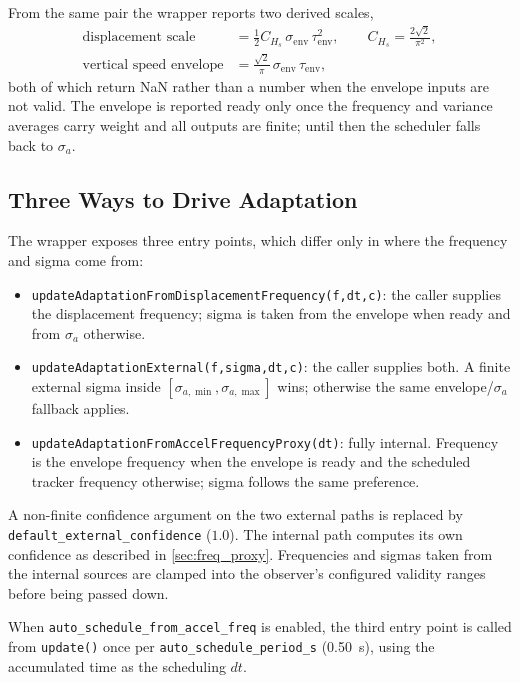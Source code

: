 \documentclass[conference]{IEEEtran}
\begin{document}
    From the same pair the wrapper reports two derived scales,
    \begin{align}
        \text{displacement scale} &= \tfrac12 C_{H_s}\,
        \sigma_{\mathrm{env}}\,\tau_{\mathrm{env}}^2,
        \qquad C_{H_s} = \frac{2\sqrt{2}}{\pi^2},\\
        \text{vertical speed envelope} &= \frac{\sqrt{2}}{\pi}\,
        \sigma_{\mathrm{env}}\,\tau_{\mathrm{env}},
    \end{align}
    both of which return NaN rather than a number when the envelope inputs are
    not valid. The envelope is reported ready only once the frequency and
    variance averages carry weight and all outputs are finite; until then the
    scheduler falls back to \(\sigma_a\).

    \subsection{Three Ways to Drive Adaptation}

    The wrapper exposes three entry points, which differ only in where the
    frequency and sigma come from:
    \begin{itemize}[leftmargin=1.4em]
        \item \texttt{updateAdaptationFromDisplacementFrequency(f,dt,c)}:
        the caller supplies the displacement frequency; sigma is taken from the
        envelope when ready and from \(\sigma_a\) otherwise.
        \item \texttt{updateAdaptationExternal(f,sigma,dt,c)}:
        the caller supplies both. A finite external sigma inside
        \([\sigma_{a,\min},\sigma_{a,\max}]\) wins; otherwise the same
        envelope/\(\sigma_a\) fallback applies.
        \item \texttt{updateAdaptationFromAccelFrequencyProxy(dt)}:
        fully internal. Frequency is the envelope frequency when the envelope is
        ready and the scheduled tracker frequency otherwise; sigma follows the
        same preference.
    \end{itemize}
    A non-finite confidence argument on the two external paths is replaced by
    \texttt{default\_external\_confidence} (\(1.0\)). The internal path computes
    its own confidence as described in \cref{sec:freq_proxy}. Frequencies and
    sigmas taken from the internal sources are clamped into the observer's
    configured validity ranges before being passed down.

    When \texttt{auto\_schedule\_from\_accel\_freq} is enabled, the third entry
    point is called from \texttt{update()} once per
    \texttt{auto\_schedule\_period\_s} (\SI{0.50}{s}), using the accumulated
    time as the scheduling \(dt\).
\end{document}
